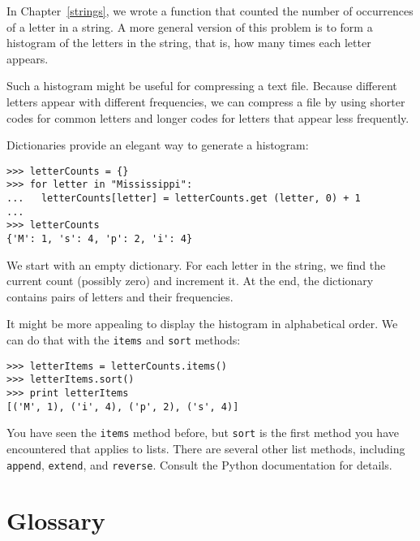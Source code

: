 In Chapter~\ref{strings}, we wrote a function that counted the number
of occurrences of a letter in a string.  A more general version of
this problem is to form a histogram of the letters in the string, that
is, how many times each letter appears.

Such a histogram might be useful for compressing a text
file.  Because different letters appear with different frequencies, we
can compress a file by using shorter codes for common letters and
longer codes for letters that appear less frequently.

Dictionaries provide an elegant way to generate a histogram:

\beforeverb
\begin{verbatim}
>>> letterCounts = {}
>>> for letter in "Mississippi":
...   letterCounts[letter] = letterCounts.get (letter, 0) + 1
...
>>> letterCounts
{'M': 1, 's': 4, 'p': 2, 'i': 4}
\end{verbatim}
\afterverb
%
We start with an empty dictionary.  For each letter in the string, we
find the current count (possibly zero) and increment it.  At the end,
the dictionary contains pairs of letters and their frequencies.

It might be more appealing to display the histogram in alphabetical
order.  We can do that with the {\tt items} and {\tt sort} methods:

\beforeverb
\begin{verbatim}
>>> letterItems = letterCounts.items()
>>> letterItems.sort()
>>> print letterItems
[('M', 1), ('i', 4), ('p', 2), ('s', 4)]
\end{verbatim}
\afterverb
%
You have seen the {\tt items} method before, but {\tt sort} is the
first method you have encountered that applies to lists.  There are
several other list methods, including {\tt append}, {\tt extend}, and
{\tt reverse}.  Consult the Python documentation for details.



\section{Glossary}

